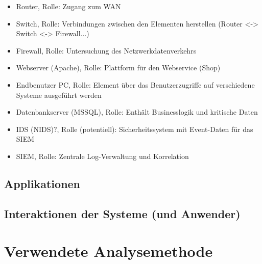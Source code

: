 
\begin{itemize}
\item Router, Rolle: Zugang zum WAN
\item Switch, Rolle: Verbindungen zwischen den Elementen herstellen (Router <-> Switch <-> Firewall...)
\item Firewall, Rolle: Untersuchung des Netzwerkdatenverkehrs 
\item Webserver (Apache), Rolle: Plattform für den Webservice (Shop)
\item Endbenutzer PC, Rolle: Element über das Benutzerzugriffe auf verschiedene Systeme ausgeführt werden
\item Datenbankserver (MSSQL), Rolle: Enthält Businesslogik und kritische Daten
\item IDS (NIDS)?, Rolle (potentiell): Sicherheitssystem mit Event-Daten für das SIEM
\item SIEM, Rolle: Zentrale Log-Verwaltung und Korrelation 
\end{itemize}
\subsection{Applikationen}



\subsection{Interaktionen der Systeme (und Anwender)}



\section{Verwendete Analysemethode}


